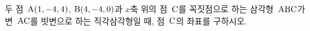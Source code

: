 두 점~$\mathrm{A}(1{,}\mkern3mu\mathopen{}-4{,}\mkern3mu\mathopen{}4)$, $\mathrm{B}(4{,}\mkern3mu\mathopen{}-4{,}\mkern3mu\mathopen{}0)$과 $x$축 위의 점~$\mathrm{C}$를 꼭짓점으로 하는 삼각형~$\mathrm{ABC}$가 변~$\mathrm{AC}$를 빗변으로 하는 직각삼각형일 때, 점~$\mathrm{C}$의 좌표를 구하시오.
